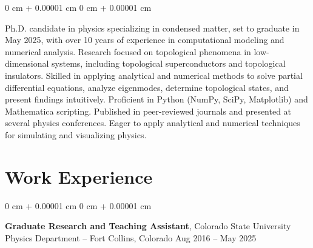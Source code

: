 \documentclass[10pt, letterpaper]{article}
\newenvironment{onecolentry}{
    \begin{adjustwidth}{
        0 cm + 0.00001 cm
    }{
        0 cm + 0.00001 cm
    }
}{
    \end{adjustwidth}
} %
\newenvironment{twocolentry}[2][]{
    \onecolentry
    \def\secondColumn{#2}
    \setcolumnwidth{\fill, 4.5 cm}
    \begin{paracol}{2}
}{
    \switchcolumn \raggedleft \secondColumn
    \end{paracol}
    \endonecolentry
} %
\begin{document}
        \begin{onecolentry}

          Ph.D. candidate in physics specializing in condensed matter, set to graduate in May 2025, with over 10 years of experience in computational modeling and numerical analysis.
          Research focused on topological phenomena in low-dimensional systems, including topological superconductors and topological insulators.
          Skilled in applying analytical and numerical methods to solve partial differential equations, analyze eigenmodes, determine topological states, and present findings intuitively.
          Proficient in Python (NumPy, SciPy, Matplotlib) and Mathematica scripting.
          Published in peer-reviewed journals and presented at several physics conferences.
          Eager to apply analytical and numerical techniques for simulating and visualizing physics.

        \end{onecolentry}

    \section{Work Experience}

        \begin{twocolentry}{
            Aug 2016 – May 2025
        }
            \textbf{Graduate Research and Teaching Assistant}, Colorado State University Physics Department -- Fort Collins, Colorado\end{twocolentry}
\end{document}
